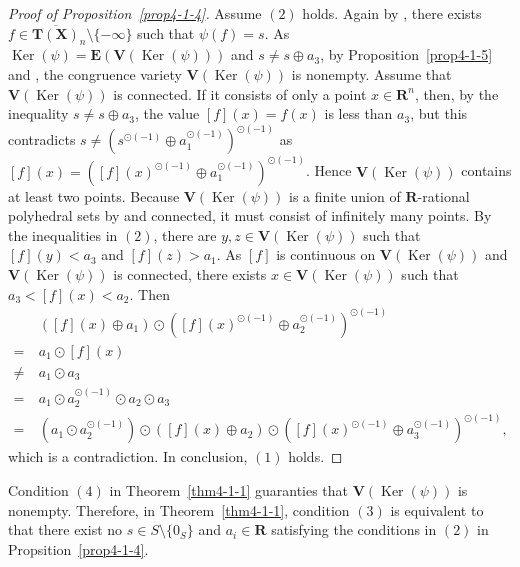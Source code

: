 \documentclass[a4paper,12pt]{amsart}
\begin{document}
\begin{proof}[Proof of Proposition~\ref{prop4-1-4}]
Assume $(2)$ holds.
Again by \cite[Proposition~2.4.4]{Giansiracusa=Giansiracusa}, there exists $f \in \overline{\boldsymbol{T}(\boldsymbol{X})}_n \setminus \{ -\infty \}$ such that $\psi(f) = s$.
As $\operatorname{Ker}(\psi) = \boldsymbol{E}(\boldsymbol{V}(\operatorname{Ker}(\psi)))$ and $s \not= s \oplus a_3$, by Proposition~\ref{prop4-1-5} and \cite[Proposition~2.4.4]{Giansiracusa=Giansiracusa}, the congruence variety $\boldsymbol{V}(\operatorname{Ker}(\psi))$ is nonempty.
Assume that $\boldsymbol{V}(\operatorname{Ker}(\psi))$ is connected.
If it consists of only a point $x \in \boldsymbol{R}^n$, then, by the inequality $s \not= s \oplus a_3$, the value $[f](x) = f(x)$ is less than $a_3$, but this contradicts $s \not= \left( s^{\odot (-1)} \oplus a_1^{\odot (-1)} \right)^{\odot (-1)}$ as $[f](x) = \left( [f](x)^{\odot (-1)} \oplus a_1^{\odot (-1)} \right)^{\odot (-1)}$.
Hence $\boldsymbol{V}(\operatorname{Ker}(\psi))$ contains at least two points.
Because $\boldsymbol{V}(\operatorname{Ker}(\psi))$ is a finite union of $\boldsymbol{R}$-rational polyhedral sets by \cite[Corollary~3.5]{JuAe5} and connected, it must consist of infinitely many points.
By the inequalities in $(2)$, there are $y, z \in \boldsymbol{V}(\operatorname{Ker}(\psi))$ such that $[f](y) < a_3$ and $[f](z) > a_1$.
As $[f]$ is continuous on $\boldsymbol{V}(\operatorname{Ker}(\psi))$ and $\boldsymbol{V}(\operatorname{Ker}(\psi))$ is connected, there exists $x \in \boldsymbol{V}(\operatorname{Ker}(\psi))$ such that $a_3 < [f](x) < a_2$.
Then
\begin{align*}
&~([f](x) \oplus a_1) \odot \left( [f](x)^{\odot (-1)} \oplus a_2^{\odot (-1)} \right)^{\odot (-1)}\\
=&~ a_1 \odot [f](x)\\
\not=&~a_1 \odot a_3\\
=&~a_1 \odot a_2^{\odot (-1)} \odot a_2 \odot a_3\\
=&~\left(a_1 \odot a_2^{\odot (-1)} \right) \odot ([f](x) \oplus a_2) \odot \left( [f](x)^{\odot (-1)} \oplus a_3^{\odot (-1)} \right)^{\odot (-1)},
\end{align*}
which is a contradiction.
In conclusion, $(1)$ holds.
\end{proof}

Condition $(4)$ in Theorem~\ref{thm4-1-1} guaranties that $\boldsymbol{V}(\operatorname{Ker}(\psi))$ is nonempty.
Therefore, in Theorem~\ref{thm4-1-1}, condition $(3)$ is equivalent to that there exist no $s \in S \setminus \{ 0_S \}$ and $a_i \in \boldsymbol{R}$ satisfying the conditions in $(2)$ in Propsition~\ref{prop4-1-4}.
\end{document}
